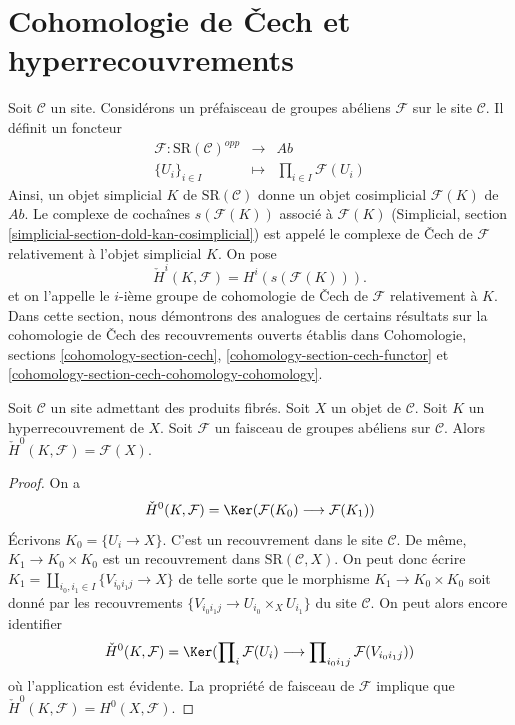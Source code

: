 \section{Cohomologie de {\v C}ech et hyperrecouvrements}
\label{section-hyper-cech}

\noindent
Soit $\mathcal{C}$ un site. Considérons un préfaisceau de
groupes abéliens $\mathcal{F}$ sur le site $\mathcal{C}$.
Il définit un foncteur
\begin{eqnarray*}
\mathcal{F} : \text{SR}(\mathcal{C})^{opp}
& \longrightarrow &
\textit{Ab} \\
\{U_i\}_{i \in I} &
\longmapsto &
\prod\nolimits_{i \in I} \mathcal{F}(U_i)
\end{eqnarray*}
Ainsi, un objet simplicial $K$ de $\text{SR}(\mathcal{C})$
donne un objet cosimplicial $\mathcal{F}(K)$ de $\textit{Ab}$.
Le complexe de cochaînes $s(\mathcal{F}(K))$ associé à $\mathcal{F}(K)$
(Simplicial, section
\ref{simplicial-section-dold-kan-cosimplicial})
est appelé le complexe de {\v C}ech de $\mathcal{F}$ relativement
à l'objet simplicial $K$. On pose
$$
\check{H}^i(K, \mathcal{F})
=
H^i(s(\mathcal{F}(K))).
$$
et on l'appelle le $i$-ième groupe de cohomologie de {\v C}ech
de $\mathcal{F}$ relativement à $K$.
Dans cette section, nous démontrons des analogues de certains résultats sur la
cohomologie de {\v C}ech des recouvrements ouverts établis dans
Cohomologie, sections \ref{cohomology-section-cech},
\ref{cohomology-section-cech-functor} et
\ref{cohomology-section-cech-cohomology-cohomology}.

\begin{lemma}
\label{lemma-h0-cech}
Soit $\mathcal{C}$ un site admettant des produits fibrés.
Soit $X$ un objet de $\mathcal{C}$.
Soit $K$ un hyperrecouvrement de $X$.
Soit $\mathcal{F}$ un faisceau de groupes abéliens sur $\mathcal{C}$.
Alors $\check{H}^0(K, \mathcal{F}) = \mathcal{F}(X)$.
\end{lemma}

\begin{proof}
On a
$$
\check{H}^0(K, \mathcal{F})
=
\Ker(\mathcal{F}(K_0) \longrightarrow \mathcal{F}(K_1))
$$
Écrivons $K_0 = \{U_i \to X\}$. C'est un recouvrement dans le site
$\mathcal{C}$. De même, $K_1 \to K_0 \times K_0$
est un recouvrement dans $\text{SR}(\mathcal{C}, X)$. On peut donc
écrire $K_1 = \amalg_{i_0, i_1 \in I} \{V_{i_0i_1j} \to X\}$
de telle sorte que le morphisme $K_1 \to K_0 \times K_0$ soit donné
par les recouvrements $\{V_{i_0i_1j} \to U_{i_0} \times_X U_{i_1}\}$
du site $\mathcal{C}$. On peut alors encore identifier
$$
\check{H}^0(K, \mathcal{F})
=
\Ker(
\prod\nolimits_i \mathcal{F}(U_i)
\longrightarrow
\prod\nolimits_{i_0i_1 j} \mathcal{F}(V_{i_0i_1j})
)
$$
où l'application est évidente. La propriété de faisceau de $\mathcal{F}$
implique que $\check{H}^0(K, \mathcal{F}) = H^0(X, \mathcal{F})$.
\end{proof}

